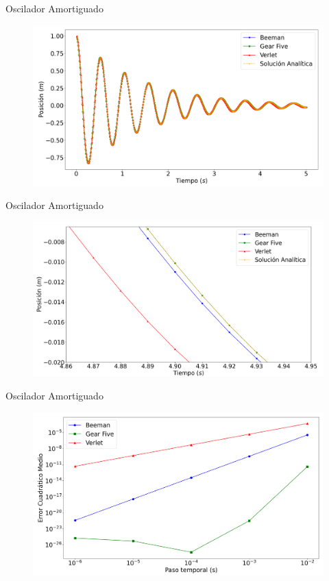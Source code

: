 \begin{frame}{Oscilador Amortiguado}
    \begin{figure}[htbp]
        \centering
        \includegraphics[width=0.9\linewidth]{pic/00-ejercicio1/todos.png}
    \end{figure}
\end{frame}

\begin{frame}{Oscilador Amortiguado}
    \begin{figure}[htbp]
        \centering
        \includegraphics[width=0.9\linewidth]{pic/00-ejercicio1/zoom.png}
    \end{figure}
\end{frame}

\begin{frame}{Oscilador Amortiguado}
    \begin{figure}[H]
        \centering
        \includegraphics[width=0.9\linewidth]{pic/00-ejercicio1/ECMs.png}\label{fig:osciladore-ECM}
    \end{figure}
\end{frame}

